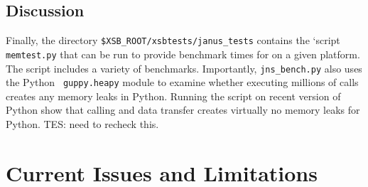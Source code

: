 %

\subsection{Discussion}

Finally, the directory {\tt \$XSB\_ROOT/xsbtests/janus\_tests} contains the
`script {\tt memtest.py} that can be run to provide benchmark times
for on a given platform.  The script includes a variety of benchmarks.
Importantly, {\tt jns\_bench.py} also uses the Python {\tt
  guppy.heapy} module to examine whether executing millions of
\januspy{} calls creates any memory leaks in Python.  Running the
script on recent version of Python show that \januspy{} calling and
\janus{} data transfer creates virtually no memory leaks for Python.
      {\sc TES: need to recheck this.}
      
\section{Current Issues and Limitations} \label{sec:jns-py-limits}

